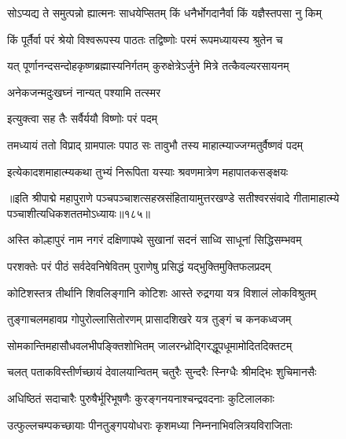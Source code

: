 \twolineshloka
{सोऽप्यद्य ते समुत्पन्नो ह्यात्मनः साधयेप्सितम्}
{किं धनैर्भोगदानैर्वा किं यज्ञैस्तपसा नु किम्} %

\twolineshloka
{किं पूर्तैर्वा परं श्रेयो विश्वरूपस्य पाठतः}
{तद्विष्णोः परमं रूपमध्यायस्य श्रुतेन च} %

\twolineshloka
{यत् पूर्णानन्दसन्दोहकृष्णब्रह्मास्यनिर्गतम्}
{कुरुक्षेत्रेऽर्जुने मित्रे तत्कैवल्यरसायनम्} %

{अनेकजन्मदुःखघ्नं नान्यत् पश्यामि तत्स्मर}


\onelineshloka
{इत्युक्त्वा सह तैः सर्वैर्ययौ विष्णोः परं पदम्} %

\twolineshloka
{तमध्यायं ततो विप्राद् ग्रामपालः पपाठ सः}
{तावुभौ तस्य माहात्म्याज्जग्मतुर्वैष्णवं पदम्} %

\twolineshloka
{इत्येकादशमाहात्म्यकथा तुभ्यं निरूपिता}
{यस्याः श्रवणमात्रेण महापातकसङ्क्षयः} %

॥इति श्रीपाद्मे महापुराणे पञ्चपञ्चाशत्सहस्रसंहितायामुत्तरखण्डे सतीश्वरसंवादे गीतामाहात्म्ये पञ्चाशीत्यधिकशततमोऽध्यायः॥१८५॥

\genMangalaShloka

\closesub

\ganapatyadiDhyanam
\padmaPuranam



\twolineshloka
{अस्ति कोल्हापुरं नाम नगरं दक्षिणापथे}
{सुखानां सदनं साध्वि साधूनां सिद्धिसम्भवम्} %

\twolineshloka
{परशक्तेः परं पीठं सर्वदेवनिषेवितम्}
{पुराणेषु प्रसिद्धं यद्भुक्तिमुक्तिफलप्रदम्} %

\twolineshloka
{कोटिशस्तत्र तीर्थानि शिवलिङ्गानि कोटिशः}
{आस्ते रुद्रगया यत्र विशालं लोकविश्रुतम्} %

\twolineshloka
{तुङ्गाचलमहावप्र गोपुरोल्लासितोरणम्}
{प्रासादशिखरे यत्र तुङ्गं च कनकध्वजम्} %

\twolineshloka
{सोमकान्तिमहासौधवलभीपङ्क्तिशोभितम्}
{जालरन्ध्रोद्गिरद्धूपधूमामोदितदिक्तटम्} %

\twolineshloka
{चलत् पताकविस्तीर्णच्छायं देवालयान्वितम्}
{चतुरैः सुन्दरैः स्निग्धैः श्रीमद्भिः शुचिमानसैः} %

\twolineshloka
{अधिष्ठितं सदाचारैः पुरुषैर्भूरिभूषणैः}
{कुरङ्गनयनाश्चन्द्रवदनाः कुटिलालकाः} %

\twolineshloka
{उत्फुल्लचम्पकच्छायाः पीनतुङ्गपयोधराः}
{कृशमध्या निम्ननाभिवलित्रयविराजिताः} %

